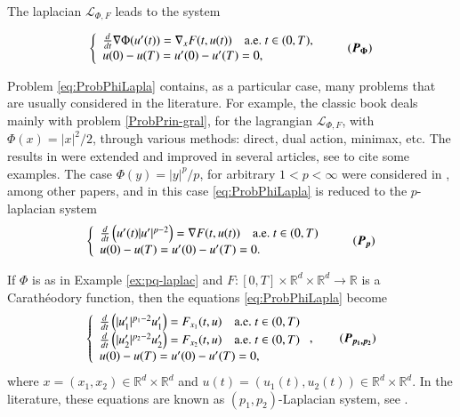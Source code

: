\documentclass[twoside]{article}
\theoremstyle{remark}
\renewcommand{\b}[1]{\boldsymbol{#1}}
\newcommand{\rr}{\mathbb{R}}
\newcounter{example}[section]
\begin{document}
The laplacian $\mathcal{L}_{\Phi,F}$ leads to the system

\begin{equation}\label{eq:ProbPhiLapla}
    \left\{%
\begin{array}{ll}
  \frac{d}{dt} \nabla \Phi(u'(t))= \nabla_{x}F(t,u(t)) \quad \hbox{a.e.}\ t \in (0,T),\\
    u(0)-u(T)=u'(0)-u'(T)=0,
\end{array}%
\right. \tag{$\b{P_{\Phi}}$}
\end{equation}

Problem \eqref{eq:ProbPhiLapla} contains, as a particular case, many problems that are usually considered in the literature.  For example, the classic book  \cite{mawhin2010critical} deals mainly with problem \eqref{ProbPrin-gral}, for the lagrangian $\mathcal{L}_{\Phi,F}$, with $\Phi(x)=|x|^2/2$, through various methods: direct, dual action, minimax, etc. The results in \cite{mawhin2010critical} were extended and improved in several articles,  see  \cite{tang1995periodic,tang1998periodic,wu1999periodic,tang2001periodic,zhao2004periodic}  to cite some examples. The case $\Phi(y)=|y|^p/p$, for arbitrary $1<p<\infty$ were considered in  \cite{Tian2007192,tang2010periodic}, among other papers, and in this case \eqref{eq:ProbPhiLapla} is reduced to the $p$-laplacian system
\begin{equation}\label{ProbP-lapla}
    \left\{%
\begin{array}{ll}
   \frac{d}{dt}\left(u'(t)|u'|^{p-2}\right) = \nabla F(t,u(t)) \quad \hbox{a.e.}\ t \in (0,T)\\
    u(0)-u(T)=u'(0)-u'(T)=0.
\end{array}%
\right.\tag{$\b{P_p}$}
\end{equation}


If $\Phi$ is as in Example \ref{ex:pq-laplac} and  $F:[0,T]\times\rr^d\times\rr^d\to\rr$ is a Carath\'eodory function, then the equations \eqref{eq:ProbPhiLapla} become
\begin{equation}\label{eq:sist-p_lapa}
    \left\{%
\begin{array}{ll}
  \frac{d}{dt}\left(|u_1'|^{p_1-2}u_1'\right)=F_{x_1}(t,u) \quad \hbox{a.e.}\ t \in (0,T)\\
  \frac{d}{dt}\left(|u_2'|^{p_2-2}u_2'\right)=F_{x_2}(t,u) \quad \hbox{a.e.}\ t \in (0,T)\\
   u(0)-u(T)=u'(0)-u'(T)=0,
\end{array}%
\right., \tag{$\b{P_{p_1,p_2}}$}
\end{equation}
where $x=(x_1,x_2)\in\rr^d\times\rr^d$ and $u(t)=(u_1(t),u_2(t))\in\rr^d\times\rr^d$. In the literature, these equations are known as $(p_1,p_2)$-Laplacian system, see
\cite{yang2013existence,pasca2016periodic,yang2012periodic,pasca2010periodic,pacsca2010some,pasca2011some,li2014periodic}.
\end{document}
